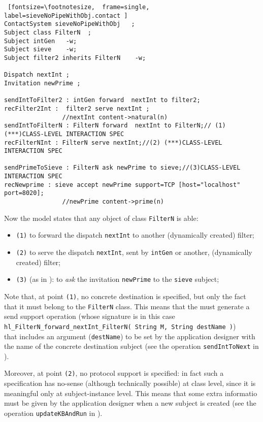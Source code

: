 \documentclass{../llncs}
\begin{document}
\begin{Verbatim} [fontsize=\footnotesize,  frame=single, label=sieveNoPipeWithObj.contact ]
ContactSystem sieveNoPipeWithObj   ;    
Subject class FilterN  ;   
Subject intGen   -w;           
Subject sieve    -w;  
Subject filter2 inherits FilterN    -w;       
            
Dispatch nextInt ;    
Invitation newPrime ; 

sendIntToFilter2 : intGen forward  nextInt to filter2; 
recFilter2Int :  filter2 serve nextInt ; 
				//nextInt content->natural(n)
sendIntToFilterN : FilterN forward  nextInt to FilterN;// (1) (***)CLASS-LEVEL INTERACTION SPEC  
recFilterNInt : FilterN serve nextInt;//(2) (***)CLASS-LEVEL INTERACTION SPEC  

sendPrimeToSieve : FilterN ask newPrime to sieve;//(3)CLASS-LEVEL INTERACTION SPEC 
recNewprime : sieve accept newPrime support=TCP [host="localhost" port=8020];  
				//newPrime content->prime(n)
\end{Verbatim}

Now the model states that any object of class \texttt{FilterN} is able:
\begin{itemize}
\item \texttt{(1)} to forward the dispatch \texttt{nextInt} to another (dynamically created) filter;
\item \texttt{(2)} to serve the dispatch \texttt{nextInt}, sent by \texttt{intGen} or another, (dynamically created) filter;
\item \texttt{(3)} (as in ): to \textit{ask} the invitation \texttt{newPrime} to the \texttt{sieve} subject;
\end{itemize}

Note that, at point \texttt{(1)}, no concrete destination is specified, but only the fact that it must belong to the \texttt{FilterN} class. This means that the \ide{} must generate a send support operation (whose signature is in this case \\
 \texttt{hl\_FilterN\_forward\_nextInt\_FilterN( String M, String destName )}) \\
 that includes an argument (\texttt{destName}) to be set by the application designer with the name of the concrete destination subject (see the operation \texttt{sendIntToNext} in ).
 
Moreover, at point  \texttt{(2)}, no protocol support is specified: in fact such a specification has no-sense (although technically possible) at class level, since it is meaningful only at subject-instance level. This means that some extra informatio must be given by the application designer when a new subject is created (see the operation \texttt{updateKBAndRun} in ).
\end{document}
